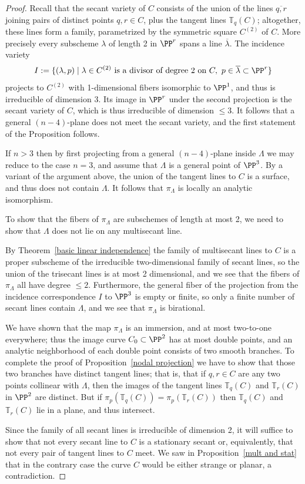 \begin{proof} Recall that the secant variety of $C$ consists of the union of the lines $\overline{q,r}$ joining pairs of distinct points $q,r \in C$, plus the tangent lines ${\mathbb T}_q(C)$; altogether, these lines form a family, parametrized by the symmetric square $C^{(2)}$ of $C$. More precisely every subscheme $\lambda$ of
length 2 in $\PP^r$ spans a line $\overline \lambda$. The incidence variety
$$
I:=\{(\lambda, p)\mid \lambda\in C^{(2)} \hbox{ is a divisor of degree 2 on }C,\ p\in \overline \lambda\subset\PP^r\}
$$
projects to $C^{(2)}$ with 1-dimensional fibers isomorphic to $\PP^1$, and thus
is irreducible of dimension 3. Its image in $\PP^r$ under the second projection
is the secant variety of $C$, which is thus irreducible of dimension $\leq 3$.
It follows that a general
$(n-4)$-plane does not meet the secant variety, and the first statement of the Proposition follows.

If $n>3$ then by first projecting from a general $(n-4)$-plane inside $\Lambda$ we may reduce to the case $n=3$, and assume that $\Lambda$ is a general point of $\PP^3$. By a variant of the argument above, the union 
of the tangent lines to $C$ is a surface, and thus does not contain $\Lambda$.
It follows that $\pi_\Lambda$ is locally an analytic isomorphism.

To show that the fibers of $\pi_\Lambda$ are subschemes of length at most 2,
we need to show that $\Lambda$ does not lie on any multisecant line. 

By Theorem~\ref{basic linear independence} the family of multisecant lines to $C$ is a proper subscheme of the irreducible two-dimensional family of secant lines, so the union of the trisecant lines is at most 2 dimensional, and we see that the fibers of $\pi_\Lambda$ all have degree $\leq 2$. Furthermore, the general fiber of the projection
from the incidence correspondence $I$ to $\PP^3$ is empty or finite, so only a finite number of secant lines contain $\Lambda$, and we see that $\pi_\Lambda$ is birational. 

We have shown that the map $\pi_\Lambda$ is an immersion, and at most two-to-one everywhere; thus the image curve $C_0 \subset \PP^2$ has at most double points, and an analytic neighborhood of each double point  consists of two smooth branches. To complete the proof of Proposition~\ref{nodal projection} we have to show that those two branches have distinct tangent lines; that is, that
if $q, r \in C$ are any two points collinear with $\Lambda$, then the images of the tangent lines ${\mathbb T}_q(C)$ and ${\mathbb T}_r(C)$ in $\PP^2$ are distinct. But if  $\pi_p({\mathbb T}_q(C)) = \pi_p({\mathbb T}_r(C))$ then  ${\mathbb T}_q(C)$ and ${\mathbb T}_r(C)$ lie in a plane, and thus intersect.

Since the family of all secant lines is irreducible of dimension 2,  it will suffice to show that not every secant line to $C$ is a stationary secant or, equivalently, that not every pair of tangent lines to $C$ meet. We saw in Proposition~\ref{mult and stat} that in the contrary case the curve $C$ would be either strange or planar, a contradiction.
\end{proof}


